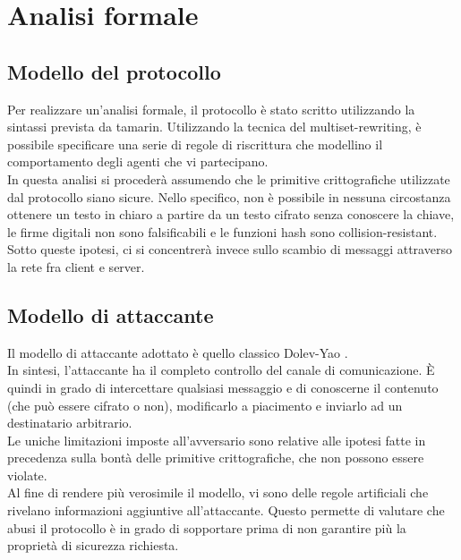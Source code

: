 \section{Analisi formale}

\subsection{Modello del protocollo}
Per realizzare un'analisi formale, il protocollo è stato scritto utilizzando la sintassi prevista da \gls{tamarin}.
Utilizzando la tecnica del \gls{multiset-rewriting}, è possibile specificare una serie di regole di riscrittura
che modellino il comportamento degli agenti che vi partecipano. \\

In questa analisi si procederà assumendo che le primitive crittografiche utilizzate dal protocollo siano sicure.
Nello specifico, non è possibile in nessuna circostanza ottenere un testo in chiaro a partire da un testo cifrato senza conoscere la chiave,
le firme digitali non sono falsificabili e le funzioni hash sono collision-resistant. \\

Sotto queste ipotesi, ci si concentrerà invece sullo scambio di messaggi attraverso la rete fra client e server.

\subsection{Modello di attaccante}
Il modello di attaccante adottato è quello classico Dolev-Yao \cite{art:dolev-yao}. \\
In sintesi, l'attaccante ha il completo controllo del canale di comunicazione.
È quindi in grado di intercettare qualsiasi messaggio e di conoscerne il contenuto (che può essere cifrato o non),
modificarlo a piacimento e inviarlo ad un destinatario arbitrario. \\
Le uniche limitazioni imposte all'avversario sono relative alle ipotesi fatte in precedenza
sulla bontà delle primitive crittografiche, che non possono essere violate. \\

Al fine di rendere più verosimile il modello, vi sono delle regole artificiali che rivelano informazioni aggiuntive all'attaccante.
Questo permette di valutare che abusi il protocollo è in grado di sopportare prima di 
non garantire più la proprietà di sicurezza richiesta.

